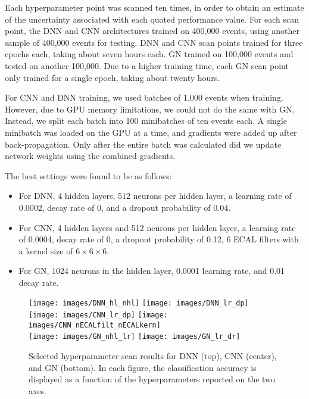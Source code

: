 Each hyperparameter point was scanned ten times, in order to obtain an estimate of the uncertainty associated with each quoted performance value. For each scan point, the DNN and CNN architectures trained on 400,000 events, using another sample of 400,000 events for testing. DNN and CNN scan points trained for three epochs each, taking about seven hours each. GN trained on 100,000 events and tested on another 100,000. Due to a higher training time, each GN scan point only trained for a single epoch, taking about twenty hours.

For CNN and DNN training, we used batches of 1,000 events when training. However, due to GPU memory limitations, we could not do the same with GN. Instead, we split each batch into 100 minibatches of ten events each. A single minibatch was loaded on the GPU at a time, and gradients were added up after back-propagation. Only after the entire batch was calculated did we update network weights using the combined gradients.

The best settings were found to be as follows:
\begin{itemize}
    \item For DNN, 4 hidden layers, 512 neurons per hidden layer, a learning rate of 0.0002, decay rate of 0, and a dropout probability of 0.04.
    \item For CNN, 4 hidden layers and 512 neurons per hidden layer, a learning rate of 0.0004, decay rate of 0, a dropout probability of 0.12, 6 ECAL filters with a kernel size of $6 \times 6 \times 6$.
    \item For GN, 1024 neurons in the hidden layer, 0.0001 learning rate, and 0.01 decay rate. 
\end{itemize}

\begin{figure*}[htbp]
\centering
\texttt{[image: images/DNN\_hl\_nhl]}
\texttt{[image: images/DNN\_lr\_dp]} \\
\texttt{[image: images/CNN\_lr\_dp]}
\texttt{[image: images/CNN\_nECALfilt\_nECALkern]} \\
\texttt{[image: images/GN\_nhl\_lr]}
\texttt{[image: images/GN\_lr\_dr]}
\caption{Selected hyperparameter scan results for DNN (top), CNN (center), and GN (bottom). In each figure, the classification accuracy is displayed as a function of the hyperparameters reported on the two axes.}
\label{fig:scan_hyperparameter}
\end{figure*}

